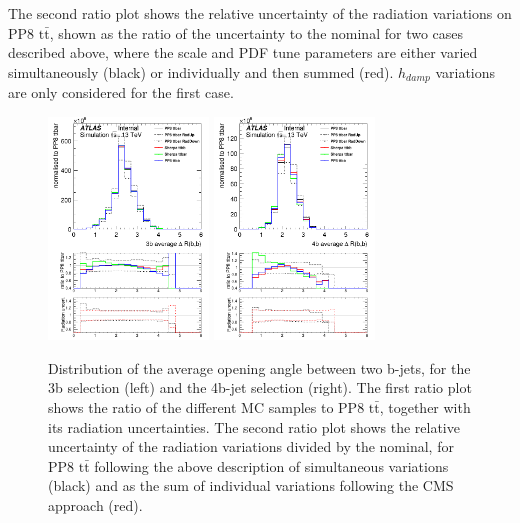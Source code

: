 The second ratio plot shows the relative uncertainty of the radiation variations on PP8 $\mathrm{t\bar{t}}$, shown as the ratio of the uncertainty to the nominal for two cases described above, where the scale and PDF tune parameters are either varied simultaneously (black) or individually and then summed (red). $h_{damp}$ variations are only considered for the first case.



\begin{figure}[!htb]
\centering
\includegraphics[width=0.38\textwidth]{Plots/ttbb/hisgenEvt_Dr_GenBJetsAverage_4j3t__div}
\includegraphics[width=0.38\textwidth]{Plots/ttbb/hisgenEvt_Dr_GenBJetsAverage_4j4t__div}
  \caption{Distribution of the average opening angle between two b-jets, for the 3b selection (left) and the 4b-jet selection (right). The first ratio plot shows the ratio of the different MC samples to PP8 $\mathrm{t\bar{t}}$, together with its radiation uncertainties. The second ratio plot shows the relative uncertainty of the radiation variations divided by the nominal, for PP8 $\mathrm{t\bar{t}}$ following the above description of simultaneous variations (black) and as the sum of individual variations following the CMS approach (red).  \label{ttbb:avedR}}
\end{figure}

